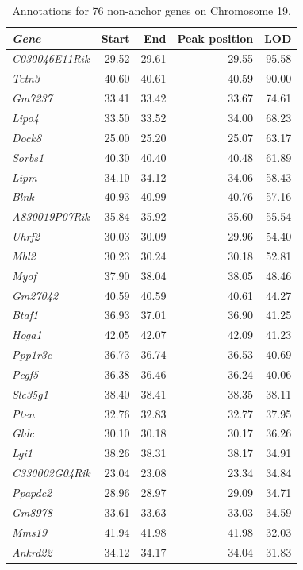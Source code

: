 \documentclass[oneside]{book}\usepackage[]{graphicx}\usepackage[]{color}
\begin{document}
\begin{appendices}
{\begin{longtable}{lrr}
\end{longtable}
}
\begin{table}[ht]
\caption{Annotations for 76 non-anchor genes on Chromosome 19.}\label{tab:ann76}
\centering
\begingroup\tiny
\begin{tabular}{>{\em}lrrrr}
  \hline
Gene & Start & End & Peak position & LOD \\
  \hline
C030046E11Rik & 29.52 & 29.61 & 29.55 & 95.58 \\
  Tctn3 & 40.60 & 40.61 & 40.59 & 90.00 \\
  Gm7237 & 33.41 & 33.42 & 33.67 & 74.61 \\
  Lipo4 & 33.50 & 33.52 & 34.00 & 68.23 \\
  Dock8 & 25.00 & 25.20 & 25.07 & 63.17 \\
  Sorbs1 & 40.30 & 40.40 & 40.48 & 61.89 \\
  Lipm & 34.10 & 34.12 & 34.06 & 58.43 \\
  Blnk & 40.93 & 40.99 & 40.76 & 57.16 \\
  A830019P07Rik & 35.84 & 35.92 & 35.60 & 55.54 \\
  Uhrf2 & 30.03 & 30.09 & 29.96 & 54.40 \\
  Mbl2 & 30.23 & 30.24 & 30.18 & 52.81 \\
  Myof & 37.90 & 38.04 & 38.05 & 48.46 \\
  Gm27042 & 40.59 & 40.59 & 40.61 & 44.27 \\
  Btaf1 & 36.93 & 37.01 & 36.90 & 41.25 \\
  Hoga1 & 42.05 & 42.07 & 42.09 & 41.23 \\
  Ppp1r3c & 36.73 & 36.74 & 36.53 & 40.69 \\
  Pcgf5 & 36.38 & 36.46 & 36.24 & 40.06 \\
  Slc35g1 & 38.40 & 38.41 & 38.35 & 38.11 \\
  Pten & 32.76 & 32.83 & 32.77 & 37.95 \\
  Gldc & 30.10 & 30.18 & 30.17 & 36.26 \\
  Lgi1 & 38.26 & 38.31 & 38.17 & 34.91 \\
  C330002G04Rik & 23.04 & 23.08 & 23.34 & 34.84 \\
  Ppapdc2 & 28.96 & 28.97 & 29.09 & 34.71 \\
  Gm8978 & 33.61 & 33.63 & 33.03 & 34.59 \\
  Mms19 & 41.94 & 41.98 & 41.98 & 32.03 \\
  Ankrd22 & 34.12 & 34.17 & 34.04 & 31.83 \\

\end{tabular}
\end{table}
\end{appendices}
\end{document}
